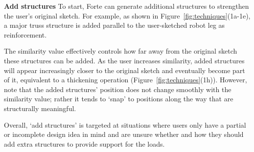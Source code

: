 
\textbf{Add structures} \hspace{0.1cm} To start, Forte can generate additional structures to strengthen the user's original sketch. For example, as shown in Figure~\ref{fig:techniques}(1a-1e), a major truss structure is added parallel to the user-sketched robot leg as reinforcement. 


The similarity value effectively controls how far away from the original sketch these structures can be added. As the user increases similarity, added structures will appear increasingly closer to the original sketch and eventually become part of it, equivalent to a thickening operation (Figure~\ref{fig:techniques}(1h)). However, note that the added structures' position does not change smoothly with the similarity value; rather it tends to `snap' to positions along the way that are structurally meaningful. 

Overall, `add structures' is targeted at situations where users only have a partial or incomplete design idea in mind and are unsure whether and how they should add extra structures to provide support for the loads.


